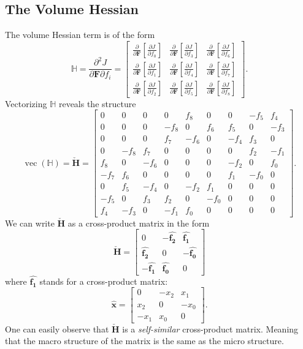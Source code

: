 \subsection{The Volume Hessian}
The volume Hessian term is of the form
\[
\mathbb{H} = \frac{\partial^2 J}{\partial \mathbf{F} \partial f_i} = \left[\begin{array}{ccc}{\frac{\partial}{\partial \mathbf{F}}\left[\frac{\partial J}{\partial f_0}\right]} & {\frac{\partial}{\partial \mathbf{F}}\left[\frac{\partial J}{\partial f_3}\right]} & {\frac{\partial}{\partial \mathbf{F}}\left[\frac{\partial J}{\partial f_6}\right]} \\ {\frac{\partial}{\partial \mathbf{F}}\left[\frac{\partial J}{\partial f_1}\right]} & {\frac{\partial}{\partial \mathbf{F}}\left[\frac{\partial J}{\partial f_4}\right]} & {\frac{\partial}{\partial \mathbf{F}}\left[\frac{\partial J}{\partial f_7}\right]} \\ {\frac{\partial}{\partial \mathbf{F}}\left[\frac{\partial J}{\partial f_2}\right]} & {\frac{\partial}{\partial \mathbf{F}}\left[\frac{\partial J}{\partial f_5}\right]} & {\frac{\partial}{\partial \mathbf{F}}\left[\frac{\partial J}{\partial f_8}\right]} \end{array}\right].
\]
Vectorizing $\mathbb{H}$ reveals the structure
\[
\operatorname{vec}(\mathbb{H}) = \mathbf{\check{H}} = \begin{bmatrix} 0 & 0 & 0 & 0 & f_8 & 0 & 0 & -f_5 & f_4 \\ 0 & 0 & 0 & -f_8 & 0 & f_6 & f_5 & 0 & -f_3 \\ 0 & 0 & 0 & f_7 & -f_6 & 0 & -f_4 & f_3 & 0 \\ 0 & -f_8 & f_7 & 0 & 0 & 0 & 0 & f_2 & -f_1 \\ f_8 & 0 & -f_6 & 0 & 0 & 0 & -f_2 & 0 & f_0 \\ -f_7 & f_6 & 0 & 0 & 0 & 0 & f_1 & -f_0 & 0 \\ 0 & f_5 & -f_4 & 0 & -f_2 & f_1 & 0 & 0 & 0 \\ -f_5 & 0 & f_3 & f_2 & 0 & -f_0 & 0 & 0 & 0 \\ f_4 & -f_3 & 0 & -f_1 & f_0 & 0 & 0 & 0 & 0 \end{bmatrix}.
\]
We can write $\mathbf{\check{H}}$ as a cross-product matrix in the form
\[
\mathbf{\check{H}} = \left[ \begin{matrix}
0 & -\mathbf{\widehat{f_2}} & \mathbf{\widehat{f_1}} \\ \mathbf{\widehat{f_2}} & 0 & -\mathbf{\widehat{f_0}} \\ -\mathbf{\widehat{f_1}} & \mathbf{\widehat{f_0}} & 0 \end{matrix} \right]
\]
where $\mathbf{\widehat{f_1}}$ stands for a cross-product matrix:
\[
\mathbf{\widehat{x}} = \left[ \begin{matrix}
0 & -x_2 & x_1 \\ x_2 & 0 & -x_0 \\ -x_1 & x_0 & 0 \end{matrix} \right].
\]
One can easily observe that $\mathbf{\check{H}}$ is a \textit{self-similar} cross-product matrix. Meaning that the macro structure of the matrix is the same as the micro structure.

